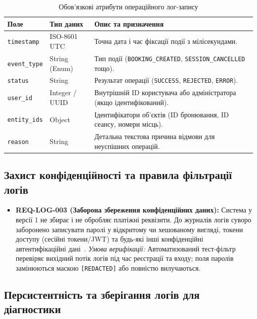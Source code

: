 \begin{table}[htbp]
\caption{Обов'язкові атрибути операційного лог-запису}\label{tab:log-fields}
\centering
\begin{tabularx}{\textwidth}{@{}l l L@{}}
\toprule
\textbf{Поле} & \textbf{Тип даних} & \textbf{Опис та призначення} \\
\midrule
\texttt{timestamp} & ISO-8601 UTC & Точна дата і час фіксації події з мілісекундами. \\
\texttt{event\_type} & String (Enum) & Тип події (\texttt{BOOKING\_CREATED}, \texttt{SESSION\_CANCELLED} тощо). \\
\texttt{status} & String & Результат операції (\texttt{SUCCESS}, \texttt{REJECTED}, \texttt{ERROR}). \\
\texttt{user\_id} & Integer / UUID & Внутрішній ID користувача або адміністратора (якщо ідентифікований). \\
\texttt{entity\_ids} & Object & Ідентифікатори об'єктів (ID бронювання, ID сеансу, номери місць). \\
\texttt{reason} & String & Детальна текстова причина відмови для неуспішних операцій. \\
\bottomrule
\end{tabularx}
\end{table}

\subsection{Захист конфіденційності та правила фільтрації логів}\label{sec:loguvannia-bezpeka}

\begin{itemize}[leftmargin=*,labelindent=0pt]
    \item \textbf{REQ-LOG-003 (Заборона збереження конфіденційних даних):} Система у версії 1 не збирає і не обробляє платіжні реквізити. До журналів логів суворо заборонено записувати паролі у відкритому чи хешованому вигляді, токени доступу (сесійні токени/JWT) та будь-які інші конфіденційні автентифікаційні дані~.
    \textit{Умова верифікації:} Автоматизований тест-фільтр перевіряє вихідний потік логів під час реєстрації та входу; поля паролів замінюються маскою \texttt{[REDACTED]} або повністю вилучаються.
\end{itemize}

\subsection{Персистентність та зберігання логів для діагностики}\label{sec:loguvannia-zberezhennia}

